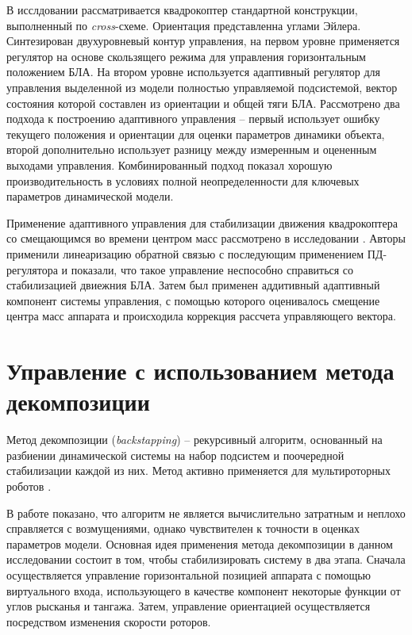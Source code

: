 В исслдовании \cite{Bara01} рассматривается квадрокоптер стандартной конструкции, выполненный по \textit{cross}-схеме. Ориентация представленна углами Эйлера. Синтезирован двухуровневый контур управления, на первом уровне применяется регулятор на основе скользящего режима для управления горизонтальным положением БЛА. На втором уровне используется адаптивный регулятор для управления выделенной из модели полностью управляемой подсистемой, вектор состояния которой составлен из ориентации и общей тяги БЛА. Рассмотрено два подхода к построению адаптивного управления -- первый использует ошибку текущего положения и ориентации для оценки параметров динамики объекта, второй дополнительно использует разницу между измеренным и оцененным выходами управления. Комбинированный подход показал хорошую производительность в условиях полной неопределенности для ключевых параметров динамической модели.

Применение адаптивного управления для стабилизации движения квадрокоптера со смещающимся во времени центром масс рассмотрено в исследовании \cite{Palunko01}. Авторы применили линеаризацию обратной связью с последующим применением ПД-регулятора и показали, что такое управление неспособно справиться со стабилизацией двиежния БЛА. Затем был применен аддитивный адаптивный компонент системы управления, с помощью которого оценивалось смещение центра масс аппарата и происходила коррекция рассчета управляющего вектора.

\section{Управление с использованием метода декомпозиции}

Метод декомпозиции (\textit{backstapping}) -- рекурсивный алгоритм, основанный на разбиении динамической системы на набор подсистем и поочередной стабилизации каждой из них. Метод активно применяется для мультироторных роботов \cite{Pota01, Chen01, Jung01, Huo01}.

В работе \cite{Madani01} показано, что алгоритм не является вычислительно затратным и неплохо справляется с возмущениями, однако чувствителен к точности в оценках параметров модели. Основная идея применения метода декомпозиции в данном исследовании состоит в том, чтобы стабилизировать систему в два этапа. Сначала осуществляется управление горизонтальной позицией аппарата с помощью виртуального входа, использующего в качестве компонент некоторые функции от углов рысканья и тангажа. Затем, управление ориентацией осуществляется посредством изменения скорости роторов.

